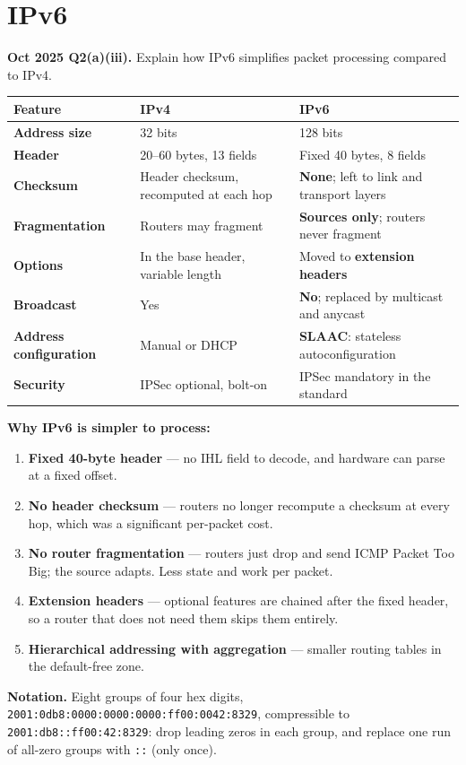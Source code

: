 \documentclass[11pt,a4paper]{article}
\begin{document}
\section{IPv6}

\begin{pyqbox}
\textbf{Oct 2025 Q2(a)(iii).} Explain how IPv6 simplifies packet processing compared to IPv4.
\end{pyqbox}

\begin{solbox}
\begin{center}\small
\begin{tabularx}{\textwidth}{>{\bfseries}p{} X X}
\toprule Feature & IPv4 & IPv6\\
\midrule
Address size & 32 bits & 128 bits\\
Header & 20--60 bytes, 13 fields & Fixed 40 bytes, 8 fields\\
Checksum & Header checksum, recomputed at each hop & \textbf{None}; left to link and transport layers\\
Fragmentation & Routers may fragment & \textbf{Sources only}; routers never fragment\\
Options & In the base header, variable length & Moved to \textbf{extension headers}\\
Broadcast & Yes & \textbf{No}; replaced by multicast and anycast\\
Address configuration & Manual or DHCP & \textbf{SLAAC}: stateless autoconfiguration\\
Security & IPSec optional, bolt-on & IPSec mandatory in the standard\\
\bottomrule
\end{tabularx}
\end{center}

\textbf{Why IPv6 is simpler to process:}
\begin{enumerate}
\item \textbf{Fixed 40-byte header} --- no IHL field to decode, and hardware can parse at a fixed offset.
\item \textbf{No header checksum} --- routers no longer recompute a checksum at every hop, which was a significant per-packet cost.
\item \textbf{No router fragmentation} --- routers just drop and send ICMP Packet Too Big; the source adapts. Less state and work per packet.
\item \textbf{Extension headers} --- optional features are chained after the fixed header, so a router that does not need them skips them entirely.
\item \textbf{Hierarchical addressing with aggregation} --- smaller routing tables in the default-free zone.
\end{enumerate}

\textbf{Notation.} Eight groups of four hex digits, \texttt{2001:0db8:0000:0000:0000:ff00:0042:8329}, compressible to \texttt{2001:db8::ff00:42:8329}: drop leading zeros in each group, and replace one run of all-zero groups with \texttt{::} (only once).
\end{solbox}
\end{document}
